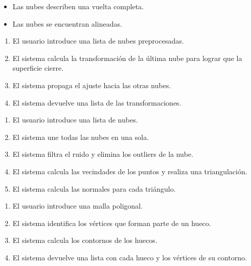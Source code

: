 		\begin{itemize}
			\item Las nubes describen una vuelta completa.
			\item Las nubes se encuentran alineadas.
		\end{itemize}
		\CUNormal
		\begin{enumerate}
			\item El usuario introduce una lista de nubes preprocesadas. 
			\item El sistema calcula la transformación de la última nube para lograr que la superficie cierre. 
			\item El sistema propaga el ajuste hacia las otras nubes.
			\item El sistema devuelve una lista de las transformaciones.
		\end{enumerate}


		\CUNormal
		\begin{enumerate}
			\item El usuario introduce una lista de nubes.
			\item El sistema une todas las nubes en una sola.
			\item El sistema filtra el ruido y elimina los outliers de la nube.
			\item El sistema calcula las vecindades de los puntos y realiza una triangulación.
			\item El sistema calcula las normales para cada triángulo.
		\end{enumerate}

		\CUNormal
		\begin{enumerate}
			\item El usuario introduce una malla poligonal.
			\item El sistema identifica los vértices que forman parte de un hueco.
			\item El sistema calcula los contornos de los huecos.
			\item El sistema devuelve una lista con cada hueco y los vértices de su contorno.
		\end{enumerate}

